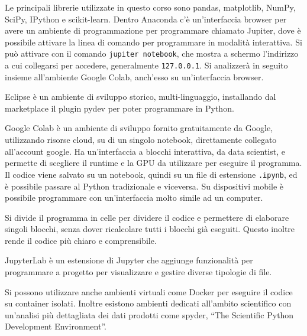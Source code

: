 \documentclass{article}
\numberwithin{equation}{subsection}
\begin{document}
Le principali librerie utilizzate in questo corso sono pandas, matplotlib, NumPy, SciPy, IPython e scikit-learn. 
Dentro Anaconda c'è un'interfaccia browser per avere un ambiente di programmazione per programmare chiamato Jupiter, dove è 
possibile attivare la linea di comando per programmare in modalità interattiva. Si può attivare con il comando \verb|jupiter notebook|, 
che mostra a schermo l'indirizzo a cui collegarsi per accedere, generalmente \verb|127.0.0.1|. Si analizzerà in seguito insieme 
all'ambiente Google Colab, anch'esso su un'interfaccia browser. 

Eclipse è un ambiente di sviluppo storico, multi-linguaggio, installando dal marketplace il plugin pydev per poter programmare in 
Python. 

Google Colab è un ambiente di sviluppo fornito gratuitamente da Google, utilizzando risorse cloud, su di un singolo 
notebook, direttamente collegato all'account google. 
Ha un'interfaccia a blocchi interattiva, da data scientist, e permette di scegliere il runtime e la GPU da utilizzare per 
eseguire il programma. Il codice viene salvato su un notebook, quindi su un file di estensione \verb|.ipynb|, ed è possibile 
passare al Python tradizionale e viceversa. Su dispositivi mobile è possibile programmare con un'interfaccia molto simile ad un 
computer. 

Si divide il programma in celle per dividere il codice e permettere di elaborare singoli blocchi, senza dover ricalcolare 
tutti i blocchi già eseguiti. Questo inoltre rende il codice più chiaro e comprensibile. 

JupyterLab è un estensione di Jupyter che aggiunge funzionalità per programmare a progetto per visualizzare e gestire diverse 
tipologie di file. 


Si possono utilizzare anche ambienti virtuali come Docker per eseguire il codice su container isolati. 
Inoltre esistono ambienti dedicati all'ambito scientifico con un'analisi più dettagliata dei dati prodotti come spyder, ``The Scientific 
Python Development Environment''. 

\clearpage
\end{document}
